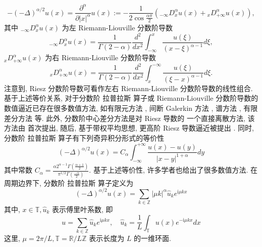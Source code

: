 \begin{equation}
-(-\Delta)^{\alpha / 2} u(x)=\frac{\partial^\alpha}{\partial|x|^\alpha} u(x):=-\frac{1}{2 \cos \frac{\alpha \pi}{2}}\left({ }_{-\infty }D_x^\alpha u(x)+{ }_x D_{+\infty}^\alpha u(x)\right),
\end{equation}
其中 ${ }_{-\infty} D_x^\alpha u(x)$ 为左 Riemann-Liouville 分数阶导数
\begin{equation}
{ }_{-\infty} D_x^\alpha u(x)=\frac{1}{\Gamma(2-\alpha)} \frac{d^2}{d x^2} \int_{-\infty}^x \frac{u(\xi)}{(x-\xi)^{\alpha-1}} d \xi,
\end{equation}
${ }_x D_{+\infty}^\alpha u(x)$ 为右 Riemann-Liouville 分数阶导数
\begin{equation}
{ }_x D_{+\infty}^\alpha u(x)=\frac{1}{\Gamma(2-\alpha)} \frac{d^2}{d x^2} \int^{-\infty}_x \frac{u(\xi)}{(\xi-x)^{\alpha-1}} d \xi .
\end{equation}
注意到, Riesz 分数阶导数可看作左右 Riemann-Liouville 分数阶导数的线性组合.
基于上述等价关系, 对于分数阶 拉普拉斯 算子或 Riemann-Liouville 分数阶导数的数值逼近已存在很多数值方法, 如有限元方法 \cite{dengFiniteElementMethod2009,ervinNumericalApproximationTime2007}, 间断 Galerkin 方法 \cite{xuDiscontinuousGalerkinMethod2014}, 谱方法 \cite{zayernouriFractionalSpectralCollocation2014,zengCrankNicolsonADI2014}, 有限差分方法 \cite{chenFourthOrderAccurate2014,meerschaertFiniteDifferenceApproximations2004} 等. 
此外, 分数阶中心差分方法是对 Riesz 导数的 一个直接离散方法, 该方法由 \cite{duAnalysisApproximationNonlocal2012} 首次提出, 随后, 基于带权平均思想, 更高阶 Riesz 导数逼近被提出 \cite{dingHighorderAlgorithmsRiesz2015,zhangFourthOrderCompactDifference2014}.
同时, 分数阶 拉普拉斯 算子有下列奇异积分形式的等价性 \cite{duAnalysisApproximationNonlocal2012}
\begin{equation}
(-\Delta)^{\alpha / 2} u(x)=C_\alpha \int_{-\infty}^{+\infty} \frac{u(x)-u(y)}{|x-y|^{1+\alpha}} d y
\end{equation}
其中常数 $C_\alpha=\frac{\alpha 2^{\alpha-1} \Gamma\left(\frac{\alpha+1}{2}\right)}{\pi^{1 / 2} \Gamma\left(\frac{-\alpha}{2}\right)}$. 基于上述等价性, 许多学者也给出了很多数值方法\cite{gaoMeanExitTime2014,huangNumericalMethodsFractional2014}. 在周期边界下, 分数阶 拉普拉斯 算子定义为 \cite{guoFractionalPartialDifferential2015}
\begin{equation}
(-\Delta)^{\alpha / 2} u(x)=\sum_{k \in \mathbb{Z}}|\mu k|^\alpha \hat{u}_k e^{\mathrm{i} \mu k x}
\end{equation}
其中, $x \in \mathbb{T}, \hat{u}_k$ 表示傅里叶系数, 即
\begin{equation}
u=\sum_{k \in \mathbb{Z}} \hat{u}_k e^{\mathrm{i} \mu k x}, \quad \hat{u}_k=\frac{1}{L} \int_{\mathbb{T}} u(x) e^{-\mathrm{i} \mu k x} d x
\end{equation}
这里, $\mu=2 \pi / L, \mathbb{T}=\mathbb{R} / L \mathbb{Z}$ 表示长度为 $L$ 的一维环面.


